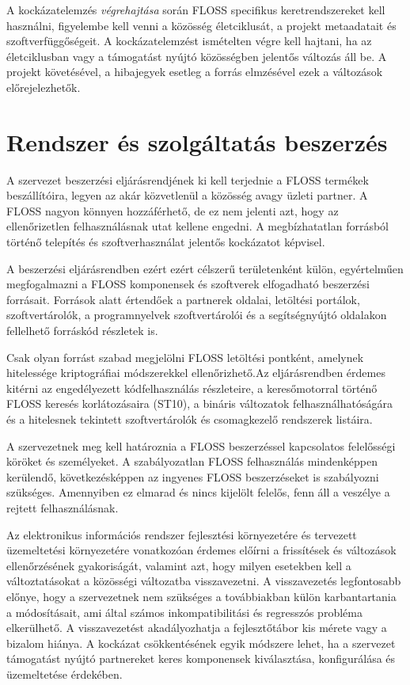 \documentclass[12pt,magyar,a4paper,oneside]{scrreprt}
\begin{document}
A kockázatelemzés \emph{végrehajtása} során FLOSS specifikus
keretrendszereket kell használni, figyelembe kell venni a közösség
életciklusát, a projekt metaadatait és szoftverfüggőségeit. A
kockázatelemzést ismételten végre kell hajtani, ha az életciklusban vagy
a támogatást nyújtó közösségben jelentős változás áll be. A projekt
követésével, a hibajegyek esetleg a forrás elmzésével ezek a változások
előrejelezhetők.

\hypertarget{rendszer-uxe9s-szolguxe1ltatuxe1s-beszerzuxe9s}{%
\section{Rendszer és szolgáltatás
beszerzés}\label{rendszer-uxe9s-szolguxe1ltatuxe1s-beszerzuxe9s}}

A szervezet beszerzési eljárásrendjének ki kell terjednie a FLOSS
termékek beszállítóira, legyen az akár közvetlenül a közösség avagy
üzleti partner. A FLOSS nagyon könnyen hozzáférhető, de ez nem jelenti
azt, hogy az ellenőrizetlen felhasználásnak utat kellene engedni. A
megbízhatatlan forrásból történő telepítés és szoftverhasználat jelentős
kockázatot képvisel.

A beszerzési eljárásrendben ezért ezért célszerű területenként külön,
egyértelműen megfogalmazni a FLOSS komponensek és szoftverek elfogadható
beszerzési forrásait. Források alatt értendőek a partnerek oldalai,
letöltési portálok, szoftvertárolók, a programnyelvek szoftvertárolói és
a segítségnyújtó oldalakon fellelhető forráskód részletek is.

Csak olyan forrást szabad megjelölni FLOSS letöltési pontként, amelynek
hitelessége kriptográfiai módszerekkel ellenőrizhető.Az eljárásrendben
érdemes kitérni az engedélyezett kódfelhasználás részleteire, a
keresőmotorral történő FLOSS keresés korlátozásaira (ST10), a bináris
változatok felhasználhatóságára és a hitelesnek tekintett
szoftvertárolók és csomagkezelő rendszerek listáira.

A szervezetnek meg kell határoznia a FLOSS beszerzéssel kapcsolatos
felelősségi köröket és személyeket. A szabályozatlan FLOSS felhasználás
mindenképpen kerülendő, következésképpen az ingyenes FLOSS beszerzéseket
is szabályozni szükséges. Amennyiben ez elmarad és nincs kijelölt
felelős, fenn áll a veszélye a rejtett felhasználásnak.

Az elektronikus információs rendszer fejlesztési környezetére és
tervezett üzemeltetési környezetére vonatkozóan érdemes előírni a
frissítések és változások ellenőrzésének gyakoriságát, valamint azt,
hogy milyen esetekben kell a változtatásokat a közösségi változatba
visszavezetni. A visszavezetés legfontosabb előnye, hogy a szervezetnek
nem szükséges a továbbiakban külön karbantartania a módosításait, ami
által számos inkompatibilitási és regresszós probléma elkerülhető. A
visszavezetést akadályozhatja a fejlesztőtábor kis mérete vagy a bizalom
hiánya. A kockázat csökkentésének egyik módszere lehet, ha a szervezet
támogatást nyújtó partnereket keres komponensek kiválasztása,
konfigurálása és üzemeltetése érdekében.
\end{document}
